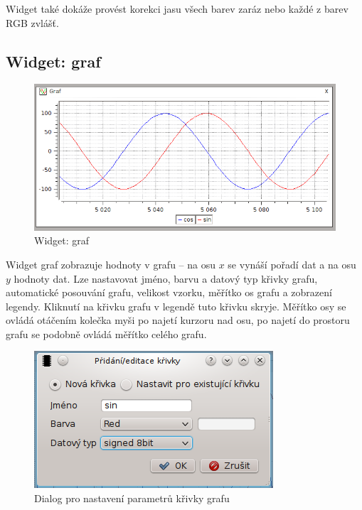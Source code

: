 \documentclass[12pt, a4paper, oneside]{article}
\begin{document}
Widget také dokáže provést korekci jasu všech barev zaráz nebo každé z barev RGB zvlášť.

\subsection{Widget: graf}
\begin{figure}[h]
\begin{center}
\includegraphics[scale=0.65]{img/w_graph.png}
\caption{Widget: graf}
\end{center}
\end{figure}
Widget graf zobrazuje hodnoty v grafu -- na osu $x$ se vynáší pořadí dat a na osu $y$ hodnoty dat. Lze nastavovat jméno, barvu a datový typ křivky grafu, automatické posouvání grafu, velikost vzorku, měřítko os grafu a zobrazení legendy. Kliknutí na křivku grafu v legendě tuto křivku skryje. Měřítko osy se ovládá otáčením kolečka myši po najetí kurzoru nad osu, po najetí do prostoru grafu se podobně ovládá měřítko celého grafu. 
\begin{figure}[h]
\begin{center}
\includegraphics[scale=0.8]{img/w_graph_add.png}
\caption{Dialog pro nastavení parametrů křivky grafu}
\end{center}
\end{figure}
\end{document}
